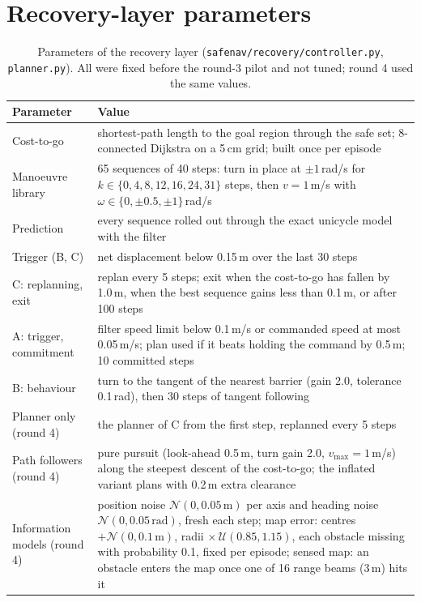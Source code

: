 \documentclass[11pt]{article}
\begin{document}
\section{Recovery-layer parameters}
\begin{table}[htbp]
\centering\small
\caption{Parameters of the recovery layer (\texttt{safenav/recovery/controller.py}, \texttt{planner.py}). All were fixed before the round-3 pilot and not tuned; round 4 used the same values.}
\begin{tabularx}{\linewidth}{@{}lX@{}}
\toprule
Parameter & Value \\
\midrule
Cost-to-go & shortest-path length to the goal region through the safe set; 8-connected Dijkstra on a 5\,cm grid; built once per episode \\
Manoeuvre library & 65 sequences of 40 steps: turn in place at $\pm1$\,rad/s for $k\in\{0,4,8,12,16,24,31\}$ steps, then $v=1$\,m/s with $\omega\in\{0,\pm0.5,\pm1\}$\,rad/s \\
Prediction & every sequence rolled out through the exact unicycle model with the filter \\
Trigger (B, C) & net displacement below 0.15\,m over the last 30 steps \\
C: replanning, exit & replan every 5 steps; exit when the cost-to-go has fallen by 1.0\,m, when the best sequence gains less than 0.1\,m, or after 100 steps \\
A: trigger, commitment & filter speed limit below 0.1\,m/s or commanded speed at most 0.05\,m/s; plan used if it beats holding the command by 0.5\,m; 10 committed steps \\
B: behaviour & turn to the tangent of the nearest barrier (gain 2.0, tolerance 0.1\,rad), then 30 steps of tangent following \\
Planner only (round 4) & the planner of C from the first step, replanned every 5 steps \\
Path followers (round 4) & pure pursuit (look-ahead 0.5\,m, turn gain 2.0, $v_{\max}=1$\,m/s) along the steepest descent of the cost-to-go; the inflated variant plans with 0.2\,m extra clearance \\
Information models (round 4) & position noise $\mathcal N(0,0.05\,\mathrm m)$ per axis and heading noise $\mathcal N(0,0.05\,\mathrm{rad})$, fresh each step; map error: centres $+\mathcal N(0,0.1\,\mathrm m)$, radii $\times\,\mathcal U(0.85,1.15)$, each obstacle missing with probability 0.1, fixed per episode; sensed map: an obstacle enters the map once one of 16 range beams (3\,m) hits it \\
\bottomrule
\end{tabularx}
\end{table}
\end{document}

